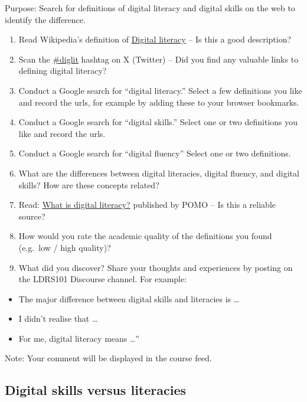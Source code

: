 \documentclass[
]{book}
\providecommand{\tightlist}{%
  \setlength{\itemsep}{0pt}\setlength{\parskip}{0pt}}
\theoremstyle{definition}
\theoremstyle{definition}
\theoremstyle{definition}
\theoremstyle{definition}
\theoremstyle{remark}
\begin{document}
\begin{reflect}
Purpose: Search for definitions of digital literacy and digital skills on the web to identify the difference.

\begin{enumerate}
\def\labelenumi{\arabic{enumi}.}
\tightlist
\item
  Read Wikipedia's definition of \href{https://en.wikipedia.org/wiki/Digital_literacy}{Digital literacy} -- Is this a good description?
\item
  Scan the \href{https://twitter.com/i/flow/login?redirect_after_login=\%2Fhashtag\%2Fdiglit\%3Fs\%3D03}{\#diglit} hashtag on X (Twitter) -- Did you find any valuable links to defining digital literacy?
\item
  Conduct a Google search for ``digital literacy.'' Select a few definitions you like and record the urls, for example by adding these to your browser bookmarks.
\item
  Conduct a Google search for ``digital skills.'' Select one or two definitions you like and record the urls.
\item
  Conduct a Google search for ``digital fluency'' Select one or two definitions.
\item
  What are the differences between digital literacies, digital fluency, and digital skills? How are these concepts related?
\item
  Read: \href{http://pomo.com.au/blog/digital-literacy/}{What is digital literacy?} published by POMO -- Is this a reliable source?
\item
  How would you rate the academic quality of the definitions you found (e.g.~low / high quality)?
\item
  What did you discover? Share your thoughts and experiences by posting on the LDRS101 Discourse channel. For example:
\end{enumerate}

\begin{itemize}
\tightlist
\item
  The major difference between digital skills and literacies is \ldots{}
\item
  I didn't realise that \ldots{}
\item
  For me, digital literacy means \ldots''
\end{itemize}

Note: Your comment will be displayed in the course feed.
\end{reflect}

\hypertarget{digital-skills-versus-literacies}{%
\subsection{Digital skills versus literacies}\label{digital-skills-versus-literacies}}
\end{document}

